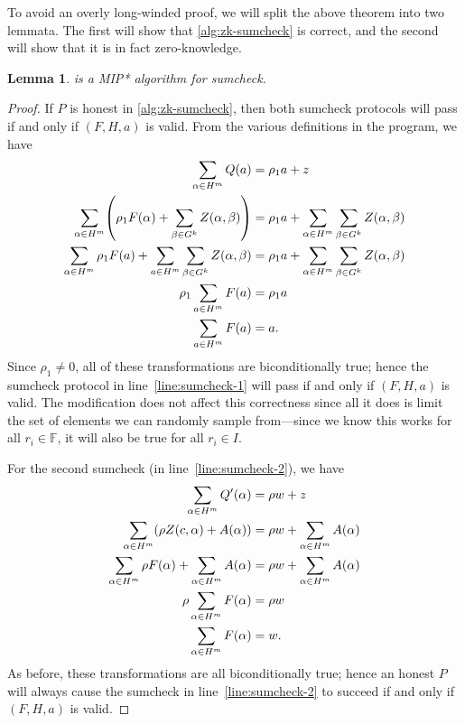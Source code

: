 \documentclass[english,12pt]{reedthesis}
\theoremstyle{plain}
\newtheorem{lemma}[lemma]{Lemma}
\theoremstyle{definition}
\theoremstyle{remark}
\begin{document}
To avoid an overly long-winded proof, we will split the above theorem into two
lemmata. The first will show that \cref{alg:zk-sumcheck} is correct, and the
second will show that it is in fact zero-knowledge.

\begin{lemma}\label{lem:sumcheck-is-correct}
   is a MIP* algorithm for sumcheck.
\end{lemma}

\begin{proof}
  If $P$ is honest in \cref{alg:zk-sumcheck}, then both sumcheck protocols will
  pass if and only if $(F, H, a)$ is valid. From the various definitions in the
  program, we have
  \begin{align*}
    \sum_{\alpha \in H^{m}}Q(a) &= \rho_{1}a + z \\
    \sum_{\alpha \in H^{m}}\mleft(\rho_{1}F(\alpha) + \sum_{\beta \in G^{k}}Z(\alpha, \beta)\mright) &= \rho_{1}a + \sum_{\alpha \in H^{m}}\sum_{\beta \in G^{k}}Z(\alpha, \beta) \\
    \sum_{\alpha \in H^{m}}\rho_{1}F(a) + \sum_{a \in H^{m}}\sum_{\beta \in G^{k}}Z(\alpha, \beta) &= \rho_{1}a + \sum_{\alpha \in H^{m}}\sum_{\beta \in G^{k}}Z(\alpha, \beta) \\
    \rho_{1}\sum_{a \in H^{m}}F(a) &= \rho_{1}a \\
    \sum_{a \in H^{m}}F(a) &= a.
  \end{align*}
  Since $\rho_{1} \ne 0$, all of these transformations are biconditionally true;
  hence the sumcheck protocol in line~\ref{line:sumcheck-1} will pass if and
  only if $(F, H, a)$ is valid. The modification does not affect this
  correctness since all it does is limit the set of elements we can randomly
  sample from---since we know this works for all $r_{i} \in \mathbb{F}$, it will
  also be true for all $r_{i} \in I$.

  For the second sumcheck (in line~\ref{line:sumcheck-2}), we have
  \begin{align*}
    \sum_{\alpha \in H^{m}}Q'(\alpha) &= \rho w + z \\
    \sum_{\alpha \in H^{m}}\mleft(\rho Z(c, \alpha) + A(\alpha)\mright) &= \rho w + \sum_{\alpha \in H^{m}}A(\alpha) \\
    \sum_{\alpha \in H^{m}}\rho F(\alpha) + \sum_{\alpha \in H^{m}}A(\alpha) &= \rho w + \sum_{\alpha \in H^{m}}A(\alpha) \\
    \rho\sum_{\alpha \in H^{m}}F(\alpha) &= \rho w \\
    \sum_{\alpha \in H^{m}}F(\alpha) &= w.
  \end{align*}
  As before, these transformations are all biconditionally true; hence an honest
  $P$ will always cause the sumcheck in line~\ref{line:sumcheck-2} to succeed if
  and only if $(F, H, a)$ is valid.


\end{proof}
\end{document}
